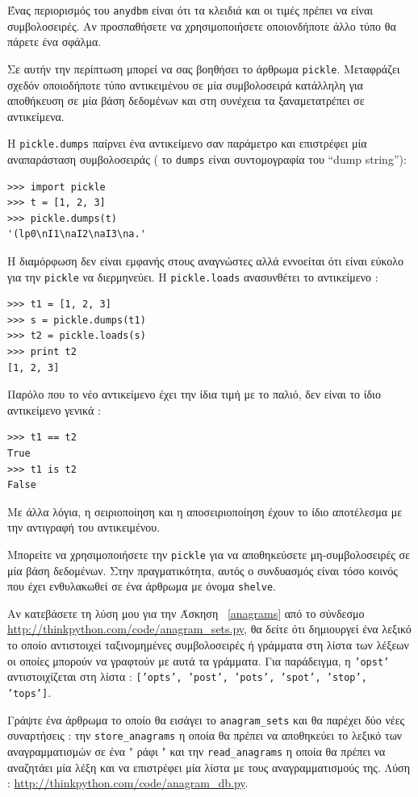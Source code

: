 \documentclass[10pt]{book}
\begin{document}
Ένας περιορισμός του  {\tt anydbm}  είναι ότι τα κλειδιά και οι τιμές πρέπει να είναι συμβολοσειρές. Αν προσπαθήσετε να χρησιμοποιήσετε οποιονδήποτε άλλο τύπο θα πάρετε ένα σφάλμα.

Σε αυτήν την περίπτωση μπορεί να σας βοηθήσει το άρθρωμα  {\tt pickle}.  Μεταφράζει σχεδόν οποιοδήποτε τύπο αντικειμένου σε μία συμβολοσειρά κατάλληλη για αποθήκευση σε μία βάση δεδομένων και στη συνέχεια τα ξαναμετατρέπει σε αντικείμενα.

Η  {\tt pickle.dumps}  παίρνει ένα αντικείμενο σαν παράμετρο και επιστρέφει μία αναπαράσταση συμβολοσειράς  ( το  {\tt dumps}  είναι συντομογραφία του  ``dump string''):

\begin{verbatim}
>>> import pickle
>>> t = [1, 2, 3]
>>> pickle.dumps(t)
'(lp0\nI1\naI2\naI3\na.'
\end{verbatim}
%
 Η διαμόρφωση δεν είναι εμφανής στους αναγνώστες αλλά εννοείται ότι είναι εύκολο για την  {\tt pickle}  να διερμηνεύει. 
Η  {\tt pickle.loads}  ανασυνθέτει το αντικείμενο :

\begin{verbatim}
>>> t1 = [1, 2, 3]
>>> s = pickle.dumps(t1)
>>> t2 = pickle.loads(s)
>>> print t2
[1, 2, 3]
\end{verbatim}
%
 Παρόλο που το νέο αντικείμενο έχει την ίδια τιμή με το παλιό, δεν είναι το ίδιο αντικείμενο γενικά :

\begin{verbatim}
>>> t1 == t2
True
>>> t1 is t2
False
\end{verbatim}
%
 Με άλλα λόγια, η σειριοποίηση και η αποσειριοποίηση έχουν το ίδιο αποτέλεσμα με την αντιγραφή του αντικειμένου.

Μπορείτε να χρησιμοποιήσετε την  {\tt pickle}  για να αποθηκεύσετε μη-συμβολοσειρές σε μία βάση δεδομένων. 
Στην πραγματικότητα, αυτός ο συνδυασμός είναι τόσο κοινός που έχει ενθυλακωθεί σε ένα άρθρωμα με όνομα  {\tt shelve}.


\begin{exercise}

Αν κατεβάσετε τη λύση μου για την Άσκηση ~\ref{anagrams}  από το σύνδεσμο  \url{http://thinkpython.com/code/anagram_sets.py},  θα δείτε ότι δημιουργεί ένα λεξικό το οποίο αντιστοιχεί ταξινομημένες συμβολοσειρές ή γράμματα στη λίστα των λέξεων οι οποίες μπορούν να γραφτούν με αυτά τα γράμματα. Για παράδειγμα, η  {\tt 'opst'}  αντιστοιχίζεται στη λίστα : {\tt ['opts', 'post', 'pots', 'spot', 'stop', 'tops']}.

 Γράψτε ένα άρθρωμα το οποίο θα εισάγει το  \verb"anagram_sets"  και θα παρέχει δύο νέες συναρτήσεις :  την  \verb"store_anagrams"  η οποία θα πρέπει να αποθηκεύει το λεξικό των αναγραμματισμών σε ένα  " ράφι "  και την  \verb"read_anagrams"  η οποία θα πρέπει να αναζητάει μία λέξη και να επιστρέφει μία λίστα με τους αναγραμματισμούς της. Λύση : \url{http://thinkpython.com/code/anagram_db.py}. 
\end{exercise}
\end{document}
